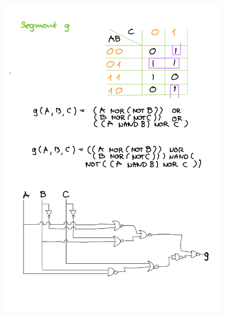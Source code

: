 \documentclass[14pt, table]{extarticle}
\begin{document}
\begin{figure}[H]
\includegraphics[scale=0.2]{Elektronika-27}
\centering
\captionsetup{labelformat=empty}
\caption{}
\end{figure}
\end{document}
